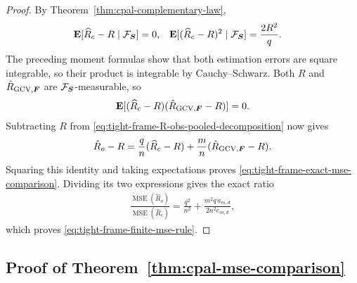 \documentclass{article}
\theoremstyle{plain} %
\theoremstyle{definition} %
\theoremstyle{definition} %
\newcommand{\GCV}{{\text{GCV}}}
\newcommand{\hR}{\hat{R}}
\begin{document}
\begin{proof}
By Theorem~\ref{thm:cpal-complementary-law},
\begin{align*}
    {\mathbf{E}}[\widehat R_c-R\mid{\mathcal F}_{\boldsymbol{S}}]&=0,
    &{\mathbf{E}}[(\widehat R_c-R)^2\mid{\mathcal F}_{\boldsymbol{S}}]
       &=\frac{2R^2}{q}.
\end{align*}
The preceding moment formulas show that both estimation errors are square
integrable, so their product is integrable by Cauchy--Schwarz.
Both $R$ and $\hR_{\GCV,\bF}$ are ${\mathcal F}_{\boldsymbol{S}}$-measurable, so
\begin{align*}
    \E[(\widehat R_c-R)(\hR_{\GCV,\bF}-R)]=0.
\end{align*}
Subtracting $R$ from
\eqref{eq:tight-frame-R-obs-pooled-decomposition} now gives
\begin{align*}
    \hR_o-R
    =\frac qn(\widehat R_c-R)
      +\frac mn(\hR_{\GCV,\bF}-R).
\end{align*}
Squaring this identity and taking expectations proves
\eqref{eq:tight-frame-exact-mse-comparison}. Dividing its two expressions
gives the exact ratio
\begin{align*}
    \frac{\operatorname{MSE}(\hR_o)}
         {\operatorname{MSE}(\widehat R_c)}
    =\frac{q^2}{n^2}+\frac{m^2q\,a_{m,d}}{2n^2e_{m,d}},
\end{align*}
which proves \eqref{eq:tight-frame-finite-mse-rule}.
\end{proof}

\subsection{Proof of Theorem~\ref{thm:cpal-mse-comparison}}
\label{app:proof-tight-frame-asymptotic-mse-threshold}
\end{document}
